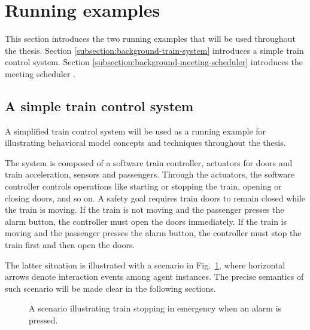 \section{Running examples\label{section:background-running-examples}}

This section introduces the two running examples that will be used throughout the thesis. Section \ref{subsection:background-train-system} introduces a simple train control system. Section \ref{subsection:background-meeting-scheduler} introduces the meeting scheduler \cite{Feather:1997}.

\subsection{A simple train control system\label{subsection:background-train-system}}

A simplified train control system will be used as a running example for illustrating behavioral model concepts and techniques throughout the thesis. 

The system is composed of a software train controller, actuators for doors and train acceleration, sensors and passengers. Through the actuators, the software controller controls operations like starting or stopping the train, opening or closing doors, and so on. A safety goal requires train doors to remain closed while the train is moving. If the train is not moving and the passenger presses the alarm button, the controller must open the doors immediately. If the train is moving and the passenger presses the alarm button, the controller must stop the train first and then open the doors. 

The latter situation is illustrated with a scenario in Fig.~\ref{image:train-scenario-all-agents}, where horizontal arrows denote interaction events among agent instances. The precise semantics of such scenario will be made clear in the following sections.

\begin{figure}[H]\centering
{}
\caption{A scenario illustrating train stopping in emergency when an alarm is pressed.\label{image:train-scenario-all-agents}}
\end{figure}

